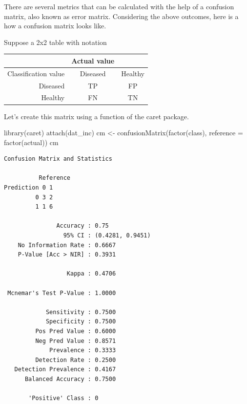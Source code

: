 \documentclass[
  letterpaper,
]{book}
\newenvironment{Shaded}{\begin{snugshade}}{\end{snugshade}}
\newcommand{\AttributeTok}[1]{\textcolor[rgb]{0.40,0.45,0.13}{#1}}
\newcommand{\FunctionTok}[1]{\textcolor[rgb]{0.28,0.35,0.67}{#1}}
\newcommand{\NormalTok}[1]{\textcolor[rgb]{0.00,0.23,0.31}{#1}}
\newcommand{\OtherTok}[1]{\textcolor[rgb]{0.00,0.23,0.31}{#1}}
\begin{document}
There are several metrics that can be calculated with the help of a
confusion matrix, also known as error matrix. Considering the above
outcomes, here is a how a confusion matrix looks like.

Suppose a 2x2 table with notation

\begin{longtable}[]{@{}rcc@{}}
\toprule\noalign{}
& Actual value & \\
\midrule\noalign{}
\endhead
\bottomrule\noalign{}
\endlastfoot
Classification value & Diseased & Healthy \\
Diseased & TP & FP \\
Healthy & FN & TN \\
\end{longtable}

Let's create this matrix using a function of the caret package.

\begin{Shaded}
\begin{Highlighting}[]
\FunctionTok{library}\NormalTok{(caret)}
\FunctionTok{attach}\NormalTok{(dat\_inc)}
\NormalTok{cm }\OtherTok{\textless{}{-}} \FunctionTok{confusionMatrix}\NormalTok{(}\FunctionTok{factor}\NormalTok{(class), }\AttributeTok{reference =} \FunctionTok{factor}\NormalTok{(actual))}
\NormalTok{cm}
\end{Highlighting}
\end{Shaded}

\begin{verbatim}
Confusion Matrix and Statistics

          Reference
Prediction 0 1
         0 3 2
         1 1 6
                                          
               Accuracy : 0.75            
                 95% CI : (0.4281, 0.9451)
    No Information Rate : 0.6667          
    P-Value [Acc > NIR] : 0.3931          
                                          
                  Kappa : 0.4706          
                                          
 Mcnemar's Test P-Value : 1.0000          
                                          
            Sensitivity : 0.7500          
            Specificity : 0.7500          
         Pos Pred Value : 0.6000          
         Neg Pred Value : 0.8571          
             Prevalence : 0.3333          
         Detection Rate : 0.2500          
   Detection Prevalence : 0.4167          
      Balanced Accuracy : 0.7500          
                                          
       'Positive' Class : 0               
                                          
\end{verbatim}
\end{document}
